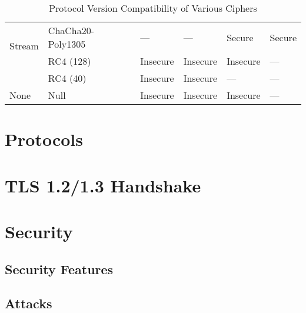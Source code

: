 \documentclass[11pt]{scrartcl} %
\begin{document}
\begin{table}[H]
\begin{tabular}{|p{2cm}|p{3cm}|p{2cm}|p{2cm}|p{2cm}|p{2cm}|}
        \multirow{2}{*}{Stream} & ChaCha20-Poly1305 & — & — & Secure & Secure \\ \cline{2-6}
         & RC4 (128) & Insecure & Insecure & Insecure & — \\ \cline{2-6}
         & RC4 (40) & Insecure & Insecure & — & — \\ \hline
         
        None & Null & Insecure & Insecure & Insecure & — \\ \hline
    \end{tabular}
    \caption{Protocol Version Compatibility of Various Ciphers}
\end{table}


\section{Protocols}




\section{TLS 1.2/1.3 Handshake}
\label{sec:tls_handshake}


\section{Security}

\subsection{Security Features}

\subsection{Attacks}

	
	
\end{document}
